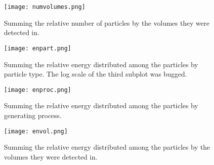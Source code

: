 \documentclass[12pt,twocolumn]{article}
\begin{document}
\begin{figure}[H]
    \centering
    \texttt{[image: numvolumes.png]}
    \caption{Summing the relative number of particles by the volumes they were detected in.}
    \label{fig:my_label}
\end{figure}

\begin{figure}[H]
    \centering
    \texttt{[image: enpart.png]}
    \caption{Summing the relative energy distributed among the particles by particle type. The log scale of the third subplot was bugged.}
    \label{fig:my_label}
\end{figure}

\begin{figure}[H]
    \centering
    \texttt{[image: enproc.png]}
    \caption{Summing the relative energy distributed among the particles by generating process.}
    \label{fig:my_label}
\end{figure}

\begin{figure}[H]
    \centering
    \texttt{[image: envol.png]}
    \caption{Summing the relative energy distributed among the particles by the volumes they were detected in.}
    \label{fig:my_label}
\end{figure}
\end{document}
